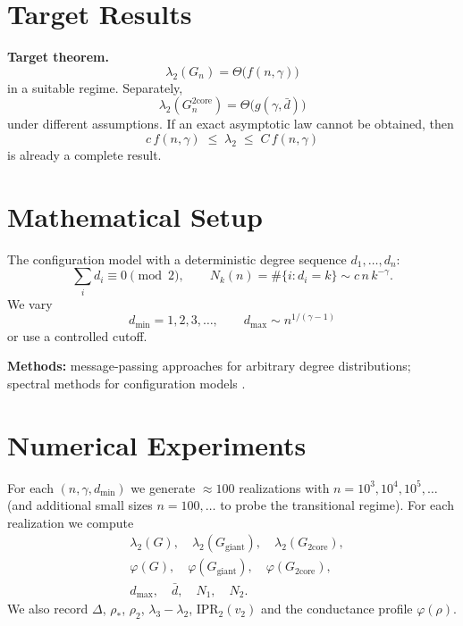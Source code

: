 \documentclass[11pt,a4paper]{article}
\theoremstyle{plain}
\theoremstyle{definition}
\theoremstyle{remark}
\newcommand{\core}{\mathrm{core}}
\newcommand{\giant}{\mathrm{giant}}
\newcommand{\Ph}{\varphi}
\newcommand{\dmin}{d_{\min}}
\newcommand{\dmax}{d_{\max}}
\newcommand{\dbar}{\bar d}
\newcommand{\lamtwo}{\lambda_2}
\newcommand{\lamthree}{\lambda_3}
\newcommand{\Ggiant}{G_{\giant}}
\newcommand{\Gtwo}{G_{2\core}}
\begin{document}
\section{Target Results}
\label{sec:result}

\textbf{Target theorem.}
\begin{equation}
\lamtwo(G_n)=\Theta\bigl(f(n,\gamma)\bigr)
\end{equation}
in a suitable regime. Separately,
\begin{equation}
\lamtwo(G_n^{2\core})=\Theta\bigl(g(\gamma,\dbar)\bigr)
\end{equation}
under different assumptions. If an exact asymptotic law cannot be obtained,
then
\begin{equation}
c\,f(n,\gamma)\;\le\;\lamtwo\;\le\;C\,f(n,\gamma)
\end{equation}
is already a complete result.

\section{Mathematical Setup}
\label{sec:setup}

The configuration model
\cite{BenderCanfield1978,MolloyReed1995,MolloyReed1998} with a deterministic
degree sequence $d_1,\dots,d_n$:
\begin{equation}
\sum_i d_i\equiv 0 \pmod 2,\qquad
N_k(n)=\#\{i:d_i=k\}\sim c\,n\,k^{-\gamma}.
\end{equation}
We vary
\begin{equation}
\dmin=1,2,3,\dots,\qquad
\dmax\sim n^{1/(\gamma-1)}
\end{equation}
or use a controlled cutoff.

\textbf{Methods:} message-passing approaches for arbitrary degree
distributions; spectral methods for configuration models
\cite{DorogovtsevGoltsevMendesSamukhin2003,Soderberg2002,BordenaveLelargeMassoulie2018}.

\section{Numerical Experiments}
\label{sec:experiments}

For each $(n,\gamma,\dmin)$ we generate $\approx 100$ realizations with
$n=10^3,10^4,10^5,\dots$ (and additional small sizes $n=100,\dots$ to probe the
transitional regime). For each realization we compute
\begin{align}
&\lamtwo(G),\quad \lamtwo(\Ggiant),\quad \lamtwo(\Gtwo),\\
&\Ph(G),\quad \Ph(\Ggiant),\quad \Ph(\Gtwo),\\
&\dmax,\quad \dbar,\quad N_1,\quad N_2 .
\end{align}
We also record $\Delta$, $\rho_*$, $\rho_2$, $\lamthree-\lamtwo$,
$\mathrm{IPR}_2(v_2)$ and the conductance profile $\Ph(\rho)$.
\end{document}

